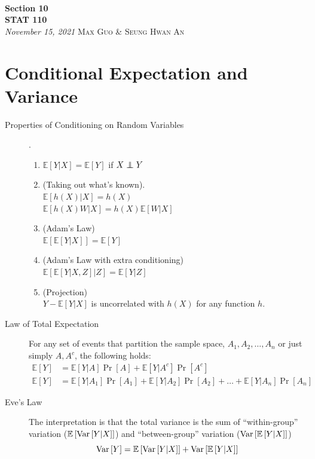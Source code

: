 \documentclass[11pt]{article}
\theoremstyle{definition}
\theoremstyle{remark}
\newcommand\independent{\protect\mathpalette{\protect\independenT}{\perp}}
\def\independenT#1#2{\mathrel{\rlap{$#1#2$}\mkern2mu{#1#2}}}
\newcommand{\E}[1]{\mathbb{E}\left[ #1 \right]}
\renewcommand{\var}[1]{\textnormal{Var}\left[ #1 \right]}
\newcommand{\inserttitle}{Section 10}
\newcommand{\insertauthor}{Max Guo \& Seung Hwan An}
\newcommand{\insertcourse}{STAT 110}
\begin{document}
{\noindent\Huge\bf  \\[0.1\baselineskip] {\inserttitle }}\\[2\baselineskip]
{{\bf \insertcourse}\\ {\textit{November 15, 2021}}} \hfill {\large \textsc{\insertauthor}}
\smallskip

\section{Conditional Expectation and Variance}
\begin{description}
	\item[Properties of Conditioning on Random Variables]. 

	\begin{enumerate}
		\item $\E{Y|X} = \E{Y}$ if $X \independent Y$
		\item (Taking out what's known). \\
		    $\E{h(X)|X} = h(X)$  \\
			$\E{h(X)W|X} = h(X)\E{W|X}$
		\item (Adam's Law) \\ 
		$\E{\E{Y|X}} = \E{Y}$
		\item (Adam's Law with extra conditioning) \\ $\E{\E{Y|X,Z}|Z}=\E{Y|Z}$
	    \item (Projection) \\
	    $Y - \E{Y | X} $ is uncorrelated with $h(X)$ for any function $h$.
	\end{enumerate}

	\item[Law of Total Expectation] For any set of events that partition the sample space, $A_1, A_2, \dots, A_n$ or just simply $A, A^c$, the following holds:
	\begin{align*}
		\E{Y} &= \E{Y|A}\Pr[A] + \E{Y|A^c}\Pr[A^c] \\
		\E{Y} &= \E{Y|A_1}\Pr[A_1] + \E{Y|A_2}\Pr[A_2] + \dots + \E{Y|A_n}\Pr[A_n]
	\end{align*}
	
	\item[Eve's Law] The interpretation is that the total variance is the sum of ``within-group'' variation ($\E{\var{Y|X}}$) and ``between-group'' variation ($\var{\E{Y|X}}$) $$\var{Y} = \E{\var{Y|X}} + \var{\E{Y|X}}$$
	
\end{description}

\pagebreak
\end{document}
